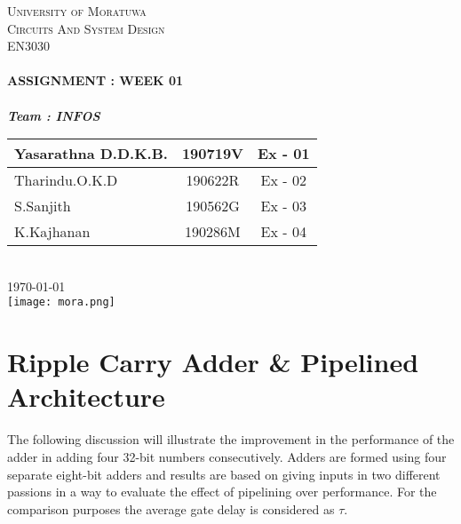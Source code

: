 \documentclass[11pt]{article}
\begin{document}
    \begin{titlepage}
        \center
        \textsc{\LARGE University of Moratuwa}\\[.5cm]

        \textsc{\Large Circuits And System Design}\\[0.2cm]
        \textsc{\large EN3030}\\[1cm]                                        %
        \HRule \\[0.4cm]
        { \Large \bfseries ASSIGNMENT : WEEK 01}\\[0.25cm]
        \HRule \\[1cm]
        \large
        \textbf{\emph{\large Team : INFOS}}\\
        [0.3cm]
        \begin{tabular}{ |l| c|c| }
            \toprule
            Yasarathna D.D.K.B. & 190719V & Ex - 01 \\
            \midrule
            Tharindu.O.K.D      & 190622R & Ex - 02 \\
            \midrule
            S.Sanjith           & 190562G & Ex - 03 \\
            \midrule
            K.Kajhanan          & 190286M & Ex - 04 \\
            \midrule
        \end{tabular}\\
        [.5cm]
        {\large \today}\\[1cm]
        \texttt{[image: mora.png]}\\[1cm]    %
        \tableofcontents
        \vfill
        \HRule
    \end{titlepage}


    \section{Ripple Carry Adder \& Pipelined Architecture}
    The following discussion will illustrate the improvement in the performance of the adder in adding four
    32-bit numbers consecutively. Adders are formed using four separate eight-bit adders and results are based
    on giving inputs in two different passions in a way to evaluate the effect of pipelining over performance.
    For the comparison purposes the average gate delay is considered as $\tau$.
\end{document}
